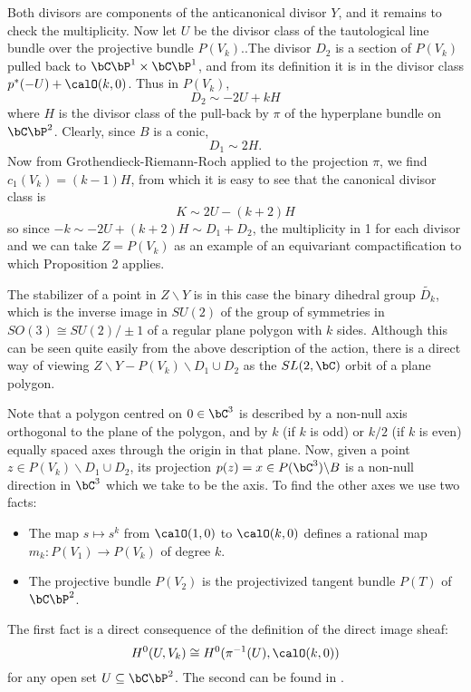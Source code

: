 Both divisors are components of the anticanonical divisor $Y$, and it  remains to check the multiplicity. Now let $U$ be the divisor class of the tautological line bundle over the projective bundle $P(V_{k})$..The divisor $D_{2}$ is a section of $P(V_{k})$ pulled back to $\bC\bP^{1} \times\bC\bP^{1}$, and from its definition it is in the divisor class $p^{*}(-U) + \calO(k,0)$. Thus in $P(V_{k})$,
\begin{equation}\label{art7-eq-8}
D_{2}\sim -2U + kH
\end{equation}
where $H$ is the divisor class of the pull-back by $\pi$ of the hyperplane bundle on $\bC\bP^{2}$. Clearly, since $B$ is a conic,
\begin{equation}\label{art7-eq-9}
D_{1} \sim 2H.
\end{equation}
Now from Grothendieck-Riemann-Roch applied to the projection $\pi$, we find $c_{1}(V_{k})=(k-1)H$, from which it is easy to see that the canonical divisor class is
$$
K\sim 2U -(k+2)H
$$
so since $-k\sim -2U +(k+2)H\sim D_{1} + D_{2}$, the multiplicity in 1 for each divisor and we can take $Z =P(V_{k})$ as an example of an equivariant compactification to which Proposition 2 applies.

The stabilizer of a point in $Z\backslash Y$ is in this case the binary dihedral group $\tilde{D_{k}}$, which is the inverse image in $SU(2)$ of the group of symmetries in $SO(3) \cong SU(2)/\pm 1$ of a regular plane polygon  with $k$ sides. Although this can be seen quite easily from the above description of the action, there is a direct way of viewing $Z\backslash Y - P(V_{k})\backslash D_{1}\cup D_{2}$ as the $SL(2, \bC)$ orbit of a plane polygon.

Note that a polygon centred on $0 \in \bC^{3}$ is described by a non-null axis orthogonal to the plane of the polygon, and by $k$ (if $k$ is odd) or $k/2$ (if $k$ is even) equally spaced axes through the origin in that plane. Now, given a point $z\in P(V_{k})\backslash D_{1}\cup D_{2}$, its projection $p(z)= x \in P(\bC^{3})\backslash B$ is a non-null direction in $\bC^{3}$ which we take to be the axis. To find the other axes we use two facts: 
\begin{itemize}
\item The map $s \mapsto s^{k}$ from $\calO(1,0)$ to $\calO(k,0)$ defines a rational map $m_{k} : P(V_{1})\rightarrow P(V_{k})$ of degree $k$.
\item The projective bundle $P(V_{2})$ is the projectivized tangent bundle $P(T)$ of $\bC\bP^{2}$.
\end{itemize}
The first fact is a direct consequence of the definition of the direct image sheaf:
$$
H^{0}(U, V_{k})\cong H^{0}(\pi^{-1}(U), \calO(k,0))
$$
for any open set $U \subseteq \bC\bP^{2}$. The second can be found in \cite{art7-key16}.

